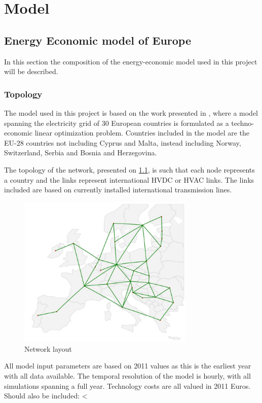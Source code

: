 
\chapter{Model}


\section{Energy Economic model of Europe}
In this section the composition of the energy-economic model used in this project will be described. 

\subsection{Topology}
The model used in  this project is based on the work presented in \cite{PyPSA_euro_30_model}, where a model spanning the electricity grid of 30 European countries is formulated as a techno-economic linear optimization problem. Countries included in the model are the EU-28 countries not including Cyprus and Malta, instead including Norway, Switzerland, Serbia and Bosnia and Herzegovina.

The topology of the network, presented on \ref{fig:network_lay}, is such that each node represents a country and the links represent international HVDC or HVAC links. The links included are based on currently installed international transmission lines. 


\begin{figure}[H]\centering
	\includegraphics[width=0.75\textwidth]{./Images/network_layout}
	\caption{Network layout}
	\label{fig:network_lay}
\end{figure}


All model input parameters are based on 2011 values as this is the earliest year with all data available. The temporal resolution of the model is hourly, with all simulations spanning a full year. Technology costs are all valued in 2011 Euros. 
Should also be included:
<
